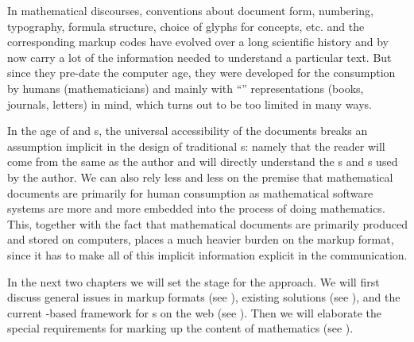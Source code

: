   In mathematical discourses, conventions about document form, numbering, typography,
  formula structure, choice of glyphs for concepts, etc. and the corresponding markup
  codes have evolved over a long scientific history and by now carry a lot of the
  information needed to understand a particular text. But since they pre-date the computer
  age, they were developed for the consumption by humans (mathematicians) and mainly with
  ``{}'' representations (books, journals, letters) in mind, which
  turns out to be too limited in many ways.

  In the age of {} and
  {s}, the universal accessibility of the
  documents breaks an assumption implicit in the design of traditional
  {s}: namely that the reader will come from the same
   as the author and will
  directly understand the {s} and {s}
  used by the author.  We can also rely less and less on the premise that mathematical
  documents are primarily for human consumption as mathematical software systems are more
  and more embedded into the process of doing mathematics. This, together with the fact
  that mathematical documents are primarily produced and stored on computers, places a
  much heavier burden on the markup format, since it has to make all of this implicit
  information explicit in the communication.

  In the next two chapters we will set the stage for the {\omdoc} approach. We will first
  discuss general issues in markup formats (see {}), existing
  solutions (see {}), and the current
  {\xml}-based framework for {s} on the web
  (see {}).  Then we will elaborate the special
  requirements for marking up the content of mathematics (see {}).



